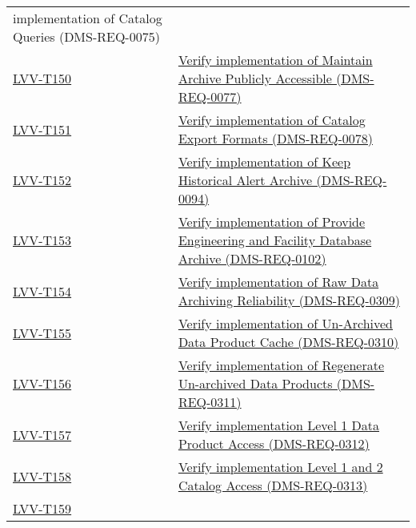 \begin{longtable}[]{p{3cm}p{13cm}}
{implementation of Catalog Queries (DMS-REQ-0075)}\tabularnewline
\protect\hyperlink{lvv-t150---verify-implementation-of-maintain-archive-publicly-accessible-dms-req-0077}{LVV-T150}
&
\href{https://jira.lsstcorp.org/secure/Tests.jspa\#/testCase/LVV-T150}{Verify
implementation of Maintain Archive Publicly Accessible
(DMS-REQ-0077)}\tabularnewline
\protect\hyperlink{lvv-t151---verify-implementation-of-catalog-export-formats-dms-req-0078}{LVV-T151}
&
\href{https://jira.lsstcorp.org/secure/Tests.jspa\#/testCase/LVV-T151}{Verify
implementation of Catalog Export Formats (DMS-REQ-0078)}\tabularnewline
\protect\hyperlink{lvv-t152---verify-implementation-of-keep-historical-alert-archive-dms-req-0094}{LVV-T152}
&
\href{https://jira.lsstcorp.org/secure/Tests.jspa\#/testCase/LVV-T152}{Verify
implementation of Keep Historical Alert Archive
(DMS-REQ-0094)}\tabularnewline
\protect\hyperlink{lvv-t153---verify-implementation-of-provide-engineering-and-facility-database-archive-dms-req-0102}{LVV-T153}
&
\href{https://jira.lsstcorp.org/secure/Tests.jspa\#/testCase/LVV-T153}{Verify
implementation of Provide Engineering and Facility Database Archive
(DMS-REQ-0102)}\tabularnewline
\protect\hyperlink{lvv-t154---verify-implementation-of-raw-data-archiving-reliability-dms-req-0309}{LVV-T154}
&
\href{https://jira.lsstcorp.org/secure/Tests.jspa\#/testCase/LVV-T154}{Verify
implementation of Raw Data Archiving Reliability
(DMS-REQ-0309)}\tabularnewline
\protect\hyperlink{lvv-t155---verify-implementation-of-un-archived-data-product-cache-dms-req-0310}{LVV-T155}
&
\href{https://jira.lsstcorp.org/secure/Tests.jspa\#/testCase/LVV-T155}{Verify
implementation of Un-Archived Data Product Cache
(DMS-REQ-0310)}\tabularnewline
\protect\hyperlink{lvv-t156---verify-implementation-of-regenerate-un-archived-data-products-dms-req-0311}{LVV-T156}
&
\href{https://jira.lsstcorp.org/secure/Tests.jspa\#/testCase/LVV-T156}{Verify
implementation of Regenerate Un-archived Data Products
(DMS-REQ-0311)}\tabularnewline
\protect\hyperlink{lvv-t157---verify-implementation-level-1-data-product-access-dms-req-0312}{LVV-T157}
&
\href{https://jira.lsstcorp.org/secure/Tests.jspa\#/testCase/LVV-T157}{Verify
implementation Level 1 Data Product Access
(DMS-REQ-0312)}\tabularnewline
\protect\hyperlink{lvv-t158---verify-implementation-level-1-and-2-catalog-access-dms-req-0313}{LVV-T158}
&
\href{https://jira.lsstcorp.org/secure/Tests.jspa\#/testCase/LVV-T158}{Verify
implementation Level 1 and 2 Catalog Access
(DMS-REQ-0313)}\tabularnewline
\protect\hyperlink{lvv-t159---verify-implementation-of-regenerating-data-products-from-previous-data-releases-dms-req-0336}{LVV-T159}

\end{longtable}
